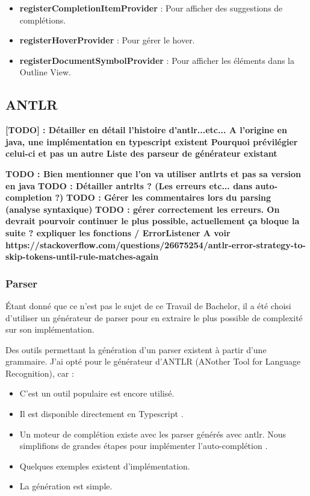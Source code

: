 \documentclass[
    iict, %
    il, %
]{heig-tb}
\begin{document}
\begin{itemize}
    \item \textbf{registerCompletionItemProvider} : Pour afficher des suggestions de complétions.
    \item \textbf{registerHoverProvider} : Pour gérer le hover.
    \item \textbf{registerDocumentSymbolProvider} : Pour afficher les éléments dans la Outline View.
\end{itemize}

\subsection{ANTLR}

\textbf{[TODO] : Détailler en détail l'histoire d'antlr...etc...
    A l'origine en java, une implémentation en typescript existent
    Pourquoi prévilégier celui-ci et pas un autre
    Liste des parseur de générateur existant
}

\textbf{TODO : Bien mentionner que l'on va utiliser antlrts et pas sa version en java}
\textbf{TODO : Détailler antrlts ? (Les erreurs etc... dans auto-completion ?)}
\textbf{TODO : Gérer les commentaires lors du parsing (analyse syntaxique)}
\textbf{TODO : gérer correctement les erreurs. On devrait pourvoir continuer le plus possible, actuellement ça bloque la suite ?
    expliquer les fonctions / ErrorListener
    A voir https://stackoverflow.com/questions/26675254/antlr-error-strategy-to-skip-tokens-until-rule-matches-again
}


\subsubsection{Parser}
Étant donné que ce n'est pas le sujet de ce Travail de Bachelor, il a été choisi d'utiliser un générateur de parser pour en extraire le plus possible de complexité sur son implémentation.

Des outils permettant la génération d'un parser existent à partir d'une grammaire.
J'ai opté pour le générateur d'ANTLR (ANother Tool for Language Recognition), car :

\begin{itemize}
    \item C'est un outil populaire est encore utilisé.
    \item Il est disponible directement en Typescript \cite{antlr4ts}.
    \item Un moteur de complétion existe avec les parser générés avec antlr. Nous simplifions de grandes étapes pour implémenter l'auto-complétion \cite{antlr4-c3}.
    \item Quelques exemples existent d'implémentation.
    \item La génération est simple.
\end{itemize}
\end{document}
